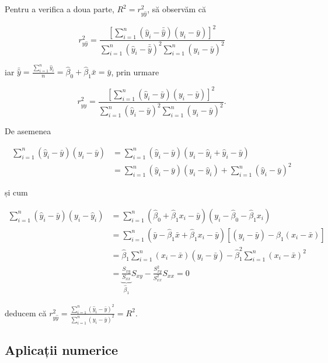 \documentclass[]{article}
\begin{document}
Pentru a verifica a doua parte, \(R^2 = r_{y\hat y}^2\), să observăm că

\[
r_{y\hat y}^2 = \frac{\left[\sum_{i = 1}^{n}(\hat y_i - \bar{\hat y})(y_i - \bar y)\right]^2}{\sum_{i = 1}^{n}(\hat y_i - \bar{\hat y})^2\sum_{i = 1}^{n}(y_i - \bar y)^2}
\]

iar
\(\bar{\hat y} = \frac{\sum_{i = 1}^{n}\hat y_i}{n} = \hat \beta_0 + \hat\beta_1 \bar x = \bar y\),
prin urmare

\[
r_{y\hat y}^2 = \frac{\left[\sum_{i = 1}^{n}(\hat y_i - \bar{y})(y_i - \bar y)\right]^2}{\sum_{i = 1}^{n}(\hat y_i - \bar{y})^2\sum_{i = 1}^{n}(y_i - \bar y)^2}.
\]

De asemenea

\begin{align*}
\sum_{i = 1}^{n}(\hat y_i - \bar{y})(y_i - \bar y) &= \sum_{i = 1}^{n}(\hat y_i - \bar{y})(y_i - \hat y_i + \hat y_i - \bar y) \\
 &= \sum_{i = 1}^{n}(\hat y_i - \bar{y})(y_i - \hat y_i) + \sum_{i = 1}^{n}(\hat y_i - \bar{y})^2
\end{align*}

și cum

\begin{align*}
\sum_{i = 1}^{n}(\hat y_i - \bar{y})(y_i - \hat y_i) &= \sum_{i = 1}^{n}(\hat \beta_0 + \hat\beta_1 x_i - \bar{y})(y_i - \hat \beta_0 - \hat\beta_1 x_i) \\
  &= \sum_{i = 1}^{n}(\bar y - \hat\beta_1 \bar x + \hat\beta_1 x_i - \bar{y})[(y_i - \bar y ) - \hat\beta_1 (x_i - \bar x)]\\
  &= \hat\beta_1 \sum_{i = 1}^{n}(x_i - \bar x)(y_i - \bar y) - \hat\beta_1^2 \sum_{i = 1}^{n}(x_i - \bar x)^2 \\
  &= \underbrace{\frac{S_{xy}}{S_{xx}}}_{\hat\beta_1}S_{xy} - \frac{S_{xy}^2}{S_{xx}^2}S_{xx} = 0
\end{align*}

deducem că
\(r_{y\hat y}^2 = \frac{\sum_{i = 1}^{n}(\hat y_i - \bar{y})^2}{\sum_{i = 1}^{n}(y_i - \bar y)^2} = R^2\).

\subsection{Aplicații numerice}\label{aplicatii-numerice}
\end{document}
